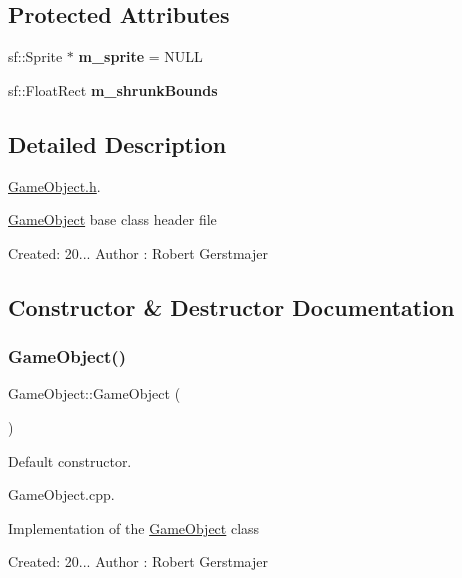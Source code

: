 \subsection*{Protected Attributes}
\begin{DoxyCompactItemize}
\item 
\mbox{\label{class_game_object_af0ec8c42a064e60872cd88b2074b5dbf}} 
sf\+::\+Sprite $\ast$ {\bfseries m\+\_\+sprite} = N\+U\+LL
\item 
\mbox{\label{class_game_object_a00513686f10a69c84bc67bed620b412e}} 
sf\+::\+Float\+Rect {\bfseries m\+\_\+shrunk\+Bounds}
\end{DoxyCompactItemize}


\subsection{Detailed Description}
\mbox{\hyperlink{_game_object_8h_source}{Game\+Object.\+h}}. 

\mbox{\hyperlink{class_game_object}{Game\+Object}} base class header file

Created\+: 20... Author \+: Robert Gerstmajer 

\subsection{Constructor \& Destructor Documentation}
\mbox{\label{class_game_object_a0348e3ee2e83d56eafca7a3547f432c4}} 
\subsubsection{\texorpdfstring{Game\+Object()}{GameObject()}}
{\footnotesize\ttfamily Game\+Object\+::\+Game\+Object (\begin{DoxyParamCaption}{ }\end{DoxyParamCaption})}



Default constructor. 

Game\+Object.\+cpp.

Implementation of the \mbox{\hyperlink{class_game_object}{Game\+Object}} class

Created\+: 20... Author \+: Robert Gerstmajer 

